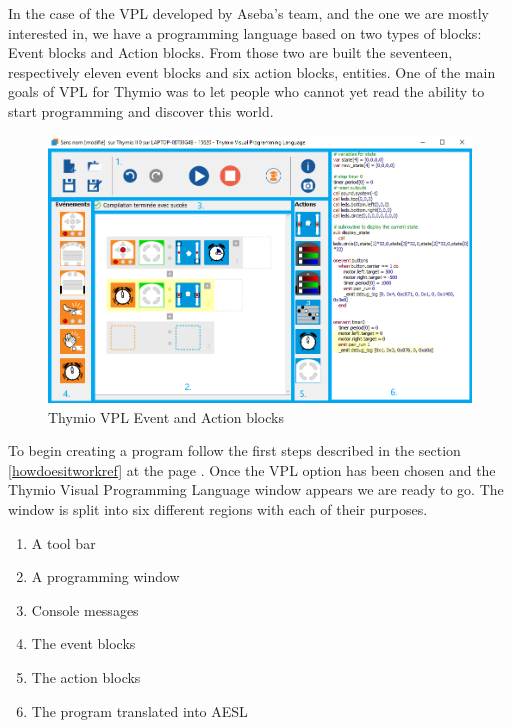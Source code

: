 \documentclass{scrartcl}
\begin{document}
In the case of the VPL developed by Aseba’s team, and the one we are mostly interested in, we have a programming language based on two types of blocks: Event blocks and Action blocks. 
From those two are built the seventeen, respectively eleven event blocks and six action blocks, entities. 
One of the main goals of VPL for Thymio was to let people who cannot yet read the ability to start programming and discover this world.\\

\begin{figure}
  \includegraphics[width=\textwidth]{./VPL/Thymio_VPL_window}
  \caption{Thymio VPL Event and Action blocks}
  \label{fig:thymio_vpl_blocks}
\end{figure}

To begin creating a program follow the first steps described in the section \ref{howdoesitworkref} at the page \pageref{howdoesitworkref}. 
Once the VPL option has been chosen and the Thymio Visual Programming Language window appears we are ready to go. 
The window is split into six different regions with each of their purposes.
\begin{enumerate}
  \item A tool bar
  \item A programming window
  \item Console messages
  \item The event blocks
  \item The action blocks
  \item The program translated into AESL
\end{enumerate}
\end{document}
